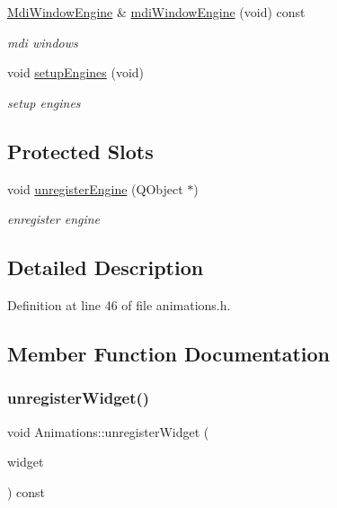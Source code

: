 \begin{DoxyCompactItemize}
\hyperlink{class_mdi_window_engine}{Mdi\+Window\+Engine} \& \hyperlink{class_animations_a9e8d4b2326923adc9af5a8068cbf17b7}{mdi\+Window\+Engine} (void) const
\begin{DoxyCompactList}\small\item\em mdi windows \end{DoxyCompactList}\item 
\mbox{\label{class_animations_aa8bf627fe94b371c33e5672ea072cfd2}} 
void \hyperlink{class_animations_aa8bf627fe94b371c33e5672ea072cfd2}{setup\+Engines} (void)
\begin{DoxyCompactList}\small\item\em setup engines \end{DoxyCompactList}\end{DoxyCompactItemize}
\subsection*{Protected Slots}
\begin{DoxyCompactItemize}
\item 
\mbox{\label{class_animations_a415faadae1c96097ab41a938fc734506}} 
void \hyperlink{class_animations_a415faadae1c96097ab41a938fc734506}{unregister\+Engine} (Q\+Object $\ast$)
\begin{DoxyCompactList}\small\item\em enregister engine \end{DoxyCompactList}\end{DoxyCompactItemize}


\subsection{Detailed Description}


Definition at line 46 of file animations.\+h.



\subsection{Member Function Documentation}
\mbox{\label{class_animations_ad6548222fa0c1211c227bec1b2c7a7c7}} 
\subsubsection{\texorpdfstring{unregister\+Widget()}{unregisterWidget()}}
{\footnotesize\ttfamily void Animations\+::unregister\+Widget (\begin{DoxyParamCaption}\item[{Q\+Widget $\ast$}]{widget }\end{DoxyParamCaption}) const}

